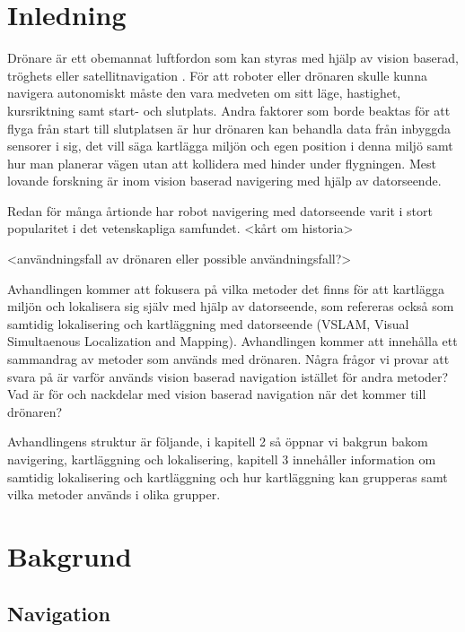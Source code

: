 
\chapter{Inledning}

Drönare är ett obemannat luftfordon som kan styras med hjälp av vision baserad, tröghets eller satellitnavigation \citep{geospatial}. För att roboter eller drönaren skulle kunna navigera autonomiskt måste den vara medveten om sitt läge, hastighet, kursriktning samt start- och slutplats. Andra faktorer som borde beaktas för att flyga från start till slutplatsen är hur drönaren kan behandla data från inbyggda sensorer i sig, det vill säga kartlägga miljön och egen position i denna miljö samt hur man planerar vägen utan att kollidera med hinder under flygningen. Mest lovande forskning är inom vision baserad navigering med hjälp av datorseende.

Redan för många årtionde har robot navigering med datorseende varit i stort popularitet i det vetenskapliga samfundet. <kårt om historia>

<användningsfall av drönaren eller possible användningsfall?>

Avhandlingen kommer att fokusera på vilka metoder det finns för att kartlägga miljön och lokalisera sig själv med hjälp av datorseende, som refereras också som samtidig lokalisering och kartläggning med datorseende (VSLAM, Visual Simultaenous Localization and Mapping). Avhandlingen kommer att innehålla ett sammandrag av metoder som används med drönaren. Några frågor vi provar att svara på är varför används vision baserad navigation istället för andra metoder? Vad är för och nackdelar med vision baserad navigation när det kommer till drönaren?

Avhandlingens struktur är följande, i kapitell 2 så öppnar vi bakgrun bakom navigering, kartläggning och lokalisering, kapitell 3 innehåller information om samtidig lokalisering och kartläggning och hur kartläggning kan grupperas samt vilka metoder används i olika grupper. 

\chapter{Bakgrund}

\section{Navigation}

